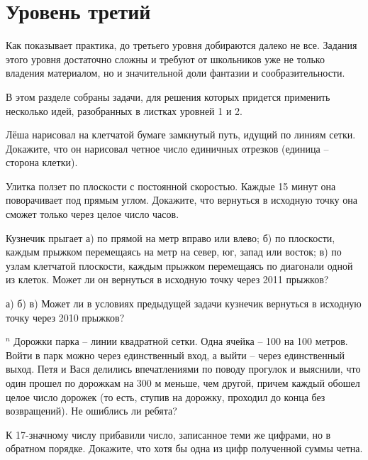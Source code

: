 \section{Уровень третий}

Как показывает практика, до третьего уровня добираются далеко не все. Задания этого уровня достаточно сложны и требуют от школьников уже не только владения материалом, но и значительной доли фантазии и сообразительности. 

В этом разделе собраны задачи, для решения которых придется применить несколько идей, разобранных в листках уровней 1 и 2.
\begin{thm}
	Лёша нарисовал на клетчатой бумаге замкнутый путь, идущий по линиям сетки. Докажите, что он нарисовал четное число единичных отрезков (единица -- сторона клетки).
\end{thm}
\begin{thm}\label{1.23}
	Улитка ползет по плоскости с постоянной скоростью. Каждые 15 минут она поворачивает под прямым углом. Докажите, что вернуться в исходную точку она сможет только через целое число часов.
\end{thm}
\begin{thm}
	Кузнечик прыгает а) по прямой на  метр вправо или влево; б) по плоскости, каждым прыжком перемещаясь на метр на север, юг, запад или восток; в)  по узлам клетчатой плоскости, каждым прыжком перемещаясь по диагонали одной из клеток. Может ли он вернуться в исходную точку через 2011 прыжков?
\end{thm}
\begin{thm} а) б) в)
	Может ли в условиях предыдущей задачи кузнечик вернуться в исходную точку через 2010 прыжков?
\end{thm}
\begin{thm}
	${}^{n}$ Дорожки парка -- линии квадратной сетки. Одна ячейка -- 100 на 100 метров. Войти в парк можно через единственный вход, а выйти -- через единственный выход. Петя и Вася делились впечатлениями по поводу прогулок и выяснили, что один прошел по дорожкам на 300 м меньше, чем другой, причем каждый обошел целое число дорожек (то есть, ступив на дорожку, проходил до конца без возвращений). Не ошиблись ли ребята?
\end{thm}
\begin{thm}\label{1.27}
	К 17-значному числу прибавили число, записанное теми же цифрами, но в обратном порядке. Докажите, что хотя бы одна из цифр полученной суммы четна.
\end{thm}
